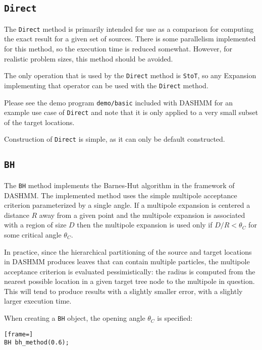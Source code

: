 \subsection{\texttt{Direct}}

The \texttt{Direct} method is primarily intended for use as a comparison for
computing
the exact result for a given set of sources. There is some parallelism
implemented for this method, so the execution time is reduced somewhat.
However, for realistic problem sizes, this method should be avoided.

The only operation that is used by the \texttt{Direct} method is
\texttt{StoT}, so any Expansion implementing that operator can be used with the
\texttt{Direct} method.

Please see the demo program \texttt{demo/basic} included with DASHMM for an
example use case of \texttt{Direct} and note that it is only applied to a very
small subset of the target locations.

Construction of \texttt{Direct} is simple, as it can only be default
constructed.

\subsection{\texttt{BH}}

The \texttt{BH} method implements the Barnes-Hut algorithm in the framework of
DASHMM. The implemented method uses the simple multipole acceptance criterion
parameterized by a single angle. If a multipole expansion is centered a
distance $R$ away from a given point and the multipole expansion is
associated with a region of size $D$ then the multipole expansion is used
only if $D/R < \theta_C$ for some critical angle $\theta_C$.

In practice, since the
hierarchical partitioning of the source and target locations in DASHMM produces
leaves that can contain multiple particles, the multipole acceptance criterion
is evaluated pessimistically: the radius is computed from the nearest possible
location in a given target tree node to the multipole in question. This will
tend to produce results with a slightly smaller error, with a slightly larger
execution time.

When creating a \texttt{BH} object, the opening angle $\theta_C$ is specified:

\begin{lstlisting}[frame=]
BH bh_method(0.6);
\end{lstlisting}


